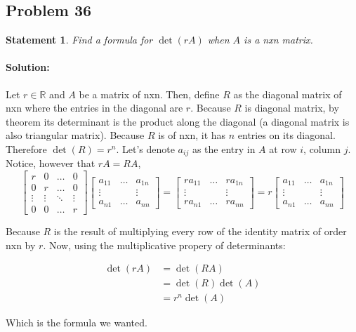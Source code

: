 \documentclass[12pt, letterpaper]{article}
\newcommand{\R}{\mathbb{R}}
\theoremstyle{statement}
\theoremstyle{statement}
\newtheorem*{atmStat}{Statement}
\newenvironment{Solution}{\noindent\ignorespaces\paragraph{Solution:}}{\hfill \ding{122}\par\noindent}
\begin{document}
    \subsection*{Problem 36}
    \begin{atmStat}
    Find a formula for $\det(rA)$ when $A$ is a nxn matrix.
    \end{atmStat}
    \begin{Solution}
    Let $r\in\R$ and $A$ be a matrix of nxn. Then, define $R$ as the diagonal matrix of nxn where the entries in the diagonal are $r$. Because $R$ is diagonal matrix, by theorem its determinant is the product along the diagonal (a diagonal matrix is also triangular matrix). Because $R$ is of nxn, it has $n$ entries on its diagonal. Therefore $\det(R)=r^n$. Let's denote $a_{ij}$ as the entry in $A$ at row $i$, column $j$. Notice, however that $rA=RA$, 
    $$
    \begin{bmatrix}
    r & 0 & \dots & 0 \\
    0 & r & \dots & 0 \\
    \vdots & \vdots & \ddots & \vdots \\
    0 & 0 & \dots & r
    \end{bmatrix}
    \begin{bmatrix}
    a_{11} & \dots & a_{1n} \\
    \vdots & & \vdots \\
    a_{n1} & \dots & a_{nn}
    \end{bmatrix}
    =
    \begin{bmatrix}
    ra_{11} & \dots & ra_{1n} \\
    \vdots & & \vdots \\
    ra_{n1} & \dots & ra_{nn}
    \end{bmatrix}
    =
    r
    \begin{bmatrix}
    a_{11} & \dots & a_{1n} \\
    \vdots & & \vdots \\
    a_{n1} & \dots & a_{nn}
    \end{bmatrix}
    $$
    
    Because $R$ is the result of multiplying every row of the identity matrix of order nxn by $r$. Now, using the multiplicative propery of determinants:
    
    \begin{align*}
       \det(rA) &= \det(RA) \\
       &= \det(R)\det(A) \\
       &= r^n\det(A)
    \end{align*}
    
    Which is the formula we wanted.
    \end{Solution}
    
\end{document}
